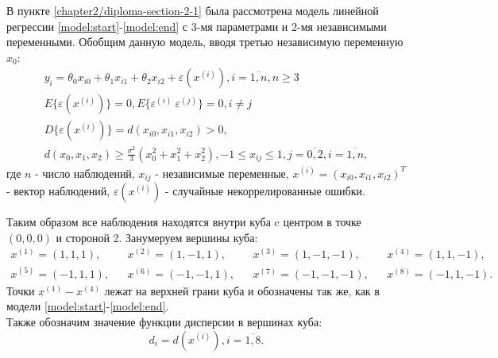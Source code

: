 В пункте \ref{chapter2/diploma-section-2-1} была рассмотрена модель линейной регрессии \eqref{model:start}-\eqref{model:end} с 3-мя параметрами и 2-мя независимыми переменными.
Обобщим данную модель, вводя третью независимую переменную $x_0$:
\begin{gather} \label{model-3x:start}
y_i = \theta_0 x_{i0} + \theta_1 x_{i1} + \theta_2 x_{i2} + \varepsilon(x^{(i)}), i = \overline{1, n}, n \ge 3 \\
E\{ \varepsilon(x^{(i)}) \} = 0, E\{ \varepsilon^{(i)}\ \varepsilon^{(j)} \} = 0, i \ne j \\
D\{ \varepsilon(x^{(i)}) \} = d(x_{i0}, x_{i1}, x_{i2}) > 0, \\
d(x_0, x_1, x_2) \ge \frac{\sigma^2}{3}(x_0^2 + x_1^2 + x_2^2) \label{model-3x:end},
-1 \le x_{ij} \le 1, j = \overline{0, 2}, i = \overline{1, n},
\end{gather}
где $n$ - число наблюдений, $x_{ij}$ - независимые переменные, $x^{(i)} = (x_{i0}, x_{i1}, x_{i2})^T$ - вектор наблюдений, $\varepsilon(x^{(i)})$ - случайные некоррелированные ошибки.

Таким образом все наблюдения находятся внутри куба c центром в точке $(0, 0, 0)$ и стороной 2.
Занумеруем вершины куба:
\begin{align*}
x^{(1)} = (1, 1, 1), && x^{(2)} = (1, -1, 1), && x^{(3)} = (1, -1, -1), && x^{(4)} = (1, 1, -1),\\
x^{(5)} = (-1, 1, 1), && x^{(6)} = (-1, -1, 1), && x^{(7)} = (-1, -1, -1), && x^{(8)} = (-1, 1, -1).
\end{align*}
Точки $x^{(1)}-x^{(4)}$ лежат на верхней грани куба и обозначены так же, как в модели \eqref{model:start}-\eqref{model:end}.\\
Также обозначим значение функции дисперсии в вершинах куба:
\begin{equation}
d_i = d(x^{(i)}), i = \overline{1, 8}.
\end{equation}


